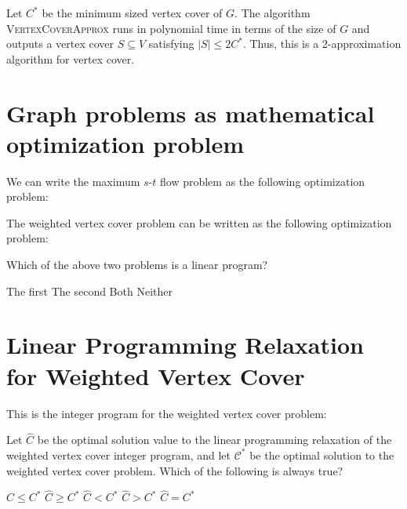 \documentclass[11  pt]{article}
\begin{document}
	\newpage
	\begin{theorem}
		Let $C^*$ be the minimum sized vertex cover of $G$. The algorithm \textsc{VertexCoverApprox} runs in polynomial time in terms of the size of $G$ and outputs a vertex cover $S \subseteq V$ satisfying $|S| \leq 2C^*$. Thus, this is a 2-approximation algorithm for vertex cover.
	\end{theorem}


	




\section{Graph problems as mathematical optimization problem}
We can write the maximum $s$-$t$ flow problem as the following optimization problem:


\vfill

The weighted vertex cover problem can be written as the following optimization problem:
\vfill

\begin{Qu}
	Which of the above two problems is a linear program?
	\begin{itemize}
		\aitem The first
		\bitem The second
		\citem Both
		\ditem Neither
	\end{itemize}
\end{Qu}


\section{Linear Programming Relaxation for Weighted Vertex Cover}
This is the integer program for the weighted vertex cover problem:



\vfill

\begin{Qu}
	Let $\hat{C}$ be the optimal solution value to the linear programming relaxation of the weighted vertex cover integer program, and let $\mathcal{C}^*$ be the optimal solution to the weighted vertex cover problem. Which of the following is always true?
	\begin{itemize}
		\aitem $\hat{C} \leq C^*$
		\bitem $\hat{C} \geq C^*$
		\citem $\hat{C} < C^*$
		\ditem $\hat{C} > C^*$
		\eitem $\hat{C} = C^*$
	\end{itemize}
\end{Qu}

\newpage
\end{document}

